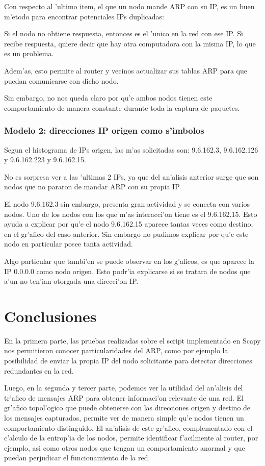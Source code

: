 \documentclass[a4paper,10pt]{article}
\begin{document}
Con respecto al 'ultimo item, el que un nodo mande ARP con su IP, es un buen m'etodo para encontrar potenciales IPs duplicadas:

Si el nodo no obtiene respuesta, entonces es el 'unico en la red con ese IP. Si recibe respuesta, quiere decir que hay otra computadora con la misma IP, lo que es un problema.

Adem'as, esto permite al router y vecinos actualizar sus tablas ARP para que puedan comunicarse con dicho nodo. 

Sin embargo, no nos queda claro por qu'e ambos nodos tienen este comportamiento de manera constante durante toda la captura de paquetes.

\subsubsection{Modelo 2: direcciones IP origen como s'imbolos}

Segun el histograma de IPs origen, las m'as solicitadas son: 9.6.162.3, 9.6.162.126 y 9.6.162.223 y 9.6.162.15.

No es sorpresa ver a las 'ultimas 2 IPs, ya que del an'alisis anterior surge que son nodos que no pararon de mandar ARP con su propia IP.

El nodo 9.6.162.3 sin embargo, presenta gran actividad y se conecta con varios nodos. Uno de los nodos con los que m'as interacci'on tiene es el 9.6.162.15. Esto ayuda a explicar por qu'e el nodo 9.6.162.15 aparece tantas veces como destino, en el gr'afico del caso anterior. Sin embargo no pudimos explicar por qu'e este nodo en particular posee tanta actividad.

Algo particular que tambi'en se puede observar en los g'aficos, es que aparece la IP 0.0.0.0 como nodo origen. Esto podr'ia explicarse si se tratara de nodos que a'un no ten'ian otorgada una direcci'on IP.

\section{Conclusiones}
\label{conclusion1:}

En la primera parte, las pruebas realizadas sobre el script implementado en Scapy nos permitieron conocer particularidades del ARP, como por ejemplo la posibilidad de enviar la propia IP del nodo solicitante para detectar direcciones redundantes en la red.

Luego, en la segunda y tercer parte, podemos ver la utilidad del an'alisis del tr'afico de mensajes ARP para obtener informaci'on relevante de una red. El gr'afico topol'ogico que puede obtenerse con las direcciones origen y destino de los mensajes capturados, permite ver de manera simple qu'e nodos tienen un comportamiento distinguido. El an'alisis de este gr'afico, complementado con el c'alculo de la entrop'ia de los nodos, permite identificar f'acilmente al router, por ejemplo, asi como otros nodos que tengan un comportamiento anormal y que puedan perjudicar el funcionamiento de la red.
\end{document}
